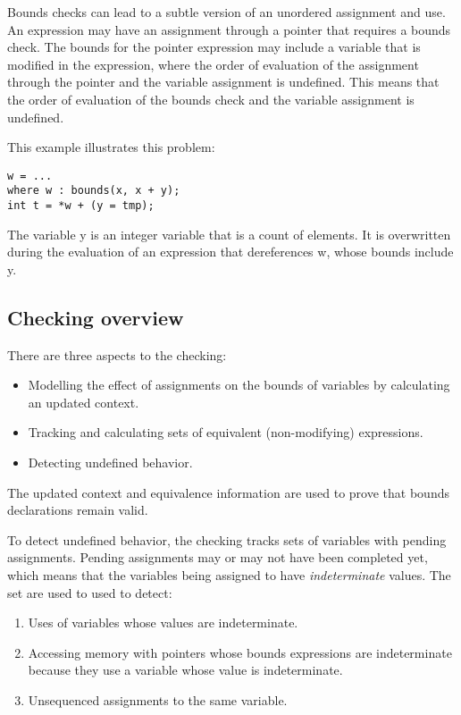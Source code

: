 Bounds checks can lead to a subtle version of an unordered assignment
and use.  An expression may have an assignment through a pointer that requires a
bounds check. The bounds for the pointer expression may include a
variable that is modified in the expression, where the order of
evaluation of the assignment through the pointer and the variable
assignment is undefined. This means that the order of evaluation of the
bounds check and the variable assignment is undefined.

This example illustrates this problem:

\begin{lstlisting}
w = ...
where w : bounds(x, x + y);
int t = *w + (y = tmp);
\end{lstlisting}

The variable y is an integer variable that is a count of elements. It is
overwritten during the evaluation of an expression that dereferences w,
whose bounds include y.

\subsection{Checking overview}
There are three aspects to the checking:
\begin{itemize}
\item Modelling the effect of assignments on the bounds
of variables by calculating an updated context.
\item Tracking and calculating sets of equivalent (non-modifying) expressions.
\item Detecting undefined behavior.
\end{itemize}
The updated context and equivalence information are used to prove that bounds
declarations remain valid. 

To detect undefined behavior, the checking tracks
sets of variables with pending assignments.  Pending
assignments may or may not have been completed yet, which means
that the variables being assigned to have {\em indeterminate}
values.  The set are used to used to detect:
\begin{enumerate}
\item Uses of variables whose values are indeterminate.
\item Accessing memory with pointers whose bounds expressions
are indeterminate because they use a variable whose value is indeterminate.
\item Unsequenced assignments to the same variable.
\end{enumerate}


